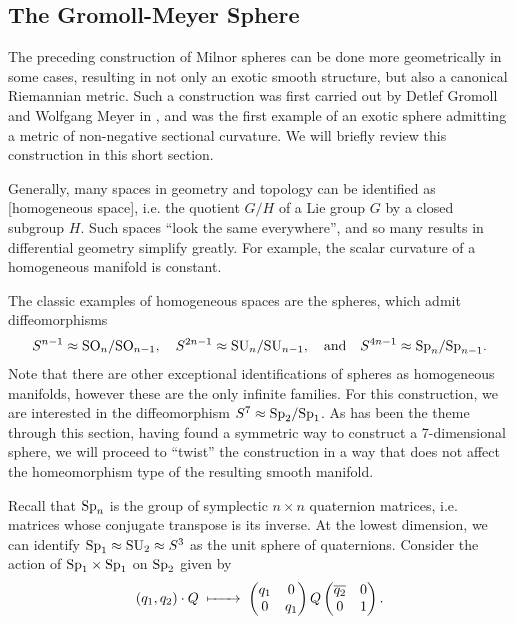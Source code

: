 \subsection{The Gromoll-Meyer Sphere}\label{sec:gromoll-meyer}

The preceding construction of Milnor spheres can be done more geometrically in some cases, resulting in not only an exotic smooth structure, but also a canonical Riemannian metric. Such a construction was first carried out by Detlef Gromoll and Wolfgang Meyer in \cite{gromollmeyer1974curvature}, and was the first example of an exotic sphere admitting a metric of non-negative sectional curvature. We will briefly review this construction in this short section.

Generally, many spaces in geometry and topology can be identified as [homogeneous space], i.e. the quotient $G/H$ of a Lie group $G$ by a closed subgroup $H$. Such spaces ``look the same everywhere'', and so many results in differential geometry simplify greatly. For example, the scalar curvature of a homogeneous manifold is constant.

The classic examples of homogeneous spaces are the spheres, which admit diffeomorphisms
\[
	S^{n-1}\approx \mathrm{SO}_n/\mathrm{SO}_{n-1},\quad S^{2n-1}\approx \mathrm{SU}_n/\mathrm{SU}_{n-1},\quad\textrm{and}\quad S^{4n-1}\approx \mathrm{Sp}_n/\mathrm{Sp}_{n-1}.
\]
Note that there are other exceptional identifications of spheres as homogeneous manifolds, however these are the only infinite families. For this construction, we are interested in the diffeomorphism $S^7\approx \mathrm{Sp}_2/\mathrm{Sp}_1$. As has been the theme through this section, having found a symmetric way to construct a 7-dimensional sphere, we will proceed to ``twist'' the construction in a way that does not affect the homeomorphism type of the resulting smooth manifold.

Recall that $\mathrm{Sp}_n$ is the group of symplectic $n\times n$ quaternion matrices, i.e. matrices whose conjugate transpose is its inverse. At the lowest dimension, we can identify $\mathrm{Sp}_1\approx \mathrm{SU}_2\approx S^3$ as the unit sphere of quaternions. Consider the action of $\mathrm{Sp}_1\times \mathrm{Sp}_1$ on $\mathrm{Sp}_2$ given by
\begin{equation}\label{eq:gromoll-meyer-action}
	(q_1, q_2)\cdot Q \lkxmapsto \begin{pmatrix} q_1 & 0\\ 0 & q_1\end{pmatrix}Q\begin{pmatrix}\overline{q_2} & 0\\ 0 & 1\end{pmatrix}.
\end{equation}

